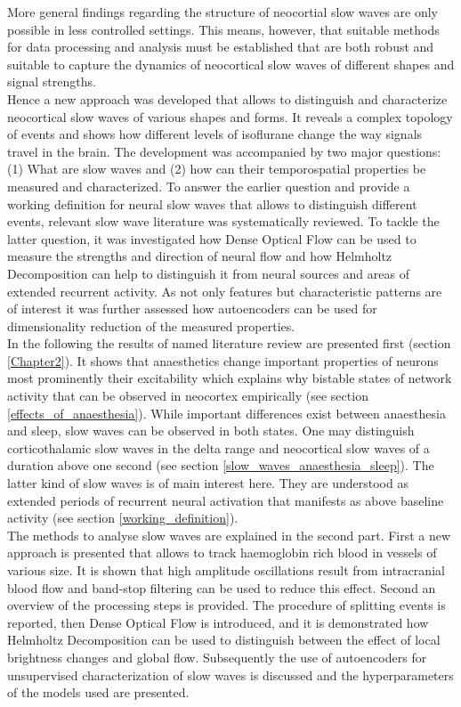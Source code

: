 More general findings regarding the structure of neocortial slow waves are only possible in less controlled settings. This means, however, that suitable methods for data processing and analysis must be established that are both robust and suitable to capture the dynamics of neocortical slow waves of different shapes and signal strengths.\\
Hence a new approach was developed that allows to distinguish and characterize neocortical slow waves of various shapes and forms. It reveals a complex topology of events and shows how different levels of isoflurane change the way signals travel in the brain. The development was accompanied by two major questions: (1) What are slow waves and (2) how can their temporospatial properties be measured and characterized. To answer the earlier question and provide a working definition for neural slow waves that allows to distinguish different events, relevant slow wave literature was systematically reviewed. To tackle the latter question, it was investigated how Dense Optical Flow can be used to measure the strengths and direction of neural flow and how Helmholtz Decomposition can help to distinguish it from neural sources and areas of extended recurrent activity. As not only features but characteristic patterns are of interest it was further assessed how autoencoders can be used for dimensionality reduction of the measured properties.\\
In the following the results of named literature review are presented first (section \ref{Chapter2}). It shows that anaesthetics change important properties of neurons most prominently their excitability which explains why bistable states of network activity that can be observed in neocortex empirically (see section \ref{effects_of_anaesthesia}). While important differences exist between anaesthesia and sleep, slow waves can be observed in both states. One may distinguish corticothalamic slow waves in the delta range and neocortical slow waves of a duration above one second (see section \ref{slow_waves_anaesthesia_sleep}). The latter kind of slow waves is of main interest here. They are understood as extended periods of recurrent neural activation that manifests as above baseline activity (see section \ref{working_definition}). \\
The methods to analyse slow waves are explained in the second part. First a new approach is presented that allows to track haemoglobin rich blood in vessels of various size. It is shown that high amplitude oscillations result from intracranial blood flow and band-stop filtering can be used to reduce this effect. Second an overview of the processing steps is provided. The procedure of splitting events is reported, then Dense Optical Flow is introduced, and it is demonstrated how Helmholtz Decomposition can be used to distinguish between the effect of local brightness changes and global flow. Subsequently the use of autoencoders for unsupervised characterization of slow waves is discussed and the hyperparameters of the models used are presented. \\
